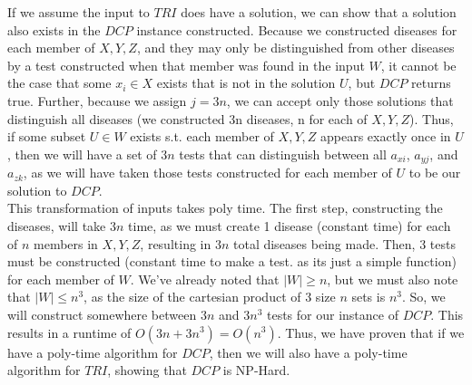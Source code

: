 \documentclass[letterpaper,notitlepage,twoside]{article}
\begin{document}
If we assume the input to $TRI$ does have a solution, we can show that a solution also exists in the $DCP$ instance constructed. Because we constructed diseases for each member of $X, Y, Z$, and they may only be distinguished from other diseases by a test constructed when that member was found in the input $W$, it cannot be the case that some $x_i \in X$ exists that is not in the solution $U$, but $DCP$ returns true. Further, because we assign $j=3n$, we can accept only those solutions that distinguish all diseases (we constructed 3n diseases, n for each of $X, Y, Z$). Thus, if some subset $U \in W$ exists s.t. each member of $X, Y, Z$ appears exactly once in $U$, then we will have a set of $3n$ tests that can distinguish between all $a_{xi}$, $a_{yj}$, and $a_{zk}$, as we will have taken those tests constructed for each member of $U$ to be our solution to $DCP$. \\
This transformation of inputs takes poly time. The first step, constructing the diseases, will take $3n$ time, as we must create 1 disease (constant time) for each of $n$ members in $X, Y, Z$, resulting in $3n$ total diseases being made. Then, 3 tests must be constructed (constant time to make a test. as its just a simple function) for each member of $W$. We've already noted that $|W| \geq n$, but we must also note that $|W| \leq n^3$, as the size of the cartesian product of 3 size $n$ sets is $n^3$. So, we will construct somewhere between $3n$ and $3n^3$ tests for our instance of $DCP$. This results in a runtime of $O(3n + 3n^3) = O(n^3)$.
Thus, we have proven that if we have a poly-time algorithm for $DCP$, then we will also have a poly-time algorithm for $TRI$, showing that $DCP$ is NP-Hard.
\end{document}
